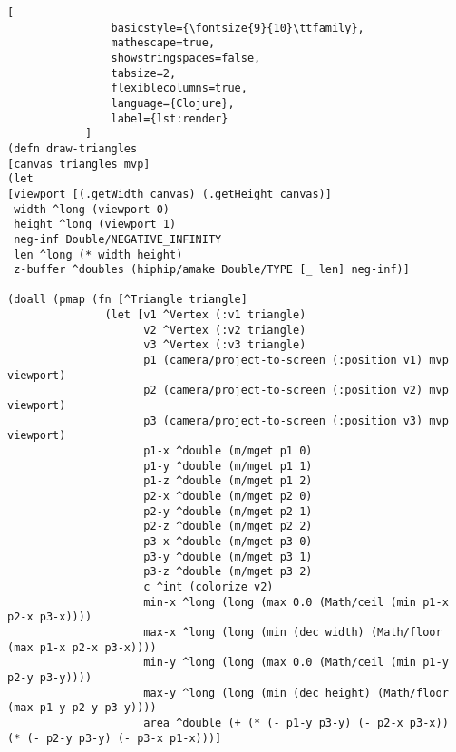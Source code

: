 \begin{lstlisting}[
                basicstyle={\fontsize{9}{10}\ttfamily},
                mathescape=true,
                showstringspaces=false,
                tabsize=2,
                flexiblecolumns=true,
                language={Clojure},
                label={lst:render}
            ]
(defn draw-triangles
[canvas triangles mvp]
(let
[viewport [(.getWidth canvas) (.getHeight canvas)]
 width ^long (viewport 0)
 height ^long (viewport 1)
 neg-inf Double/NEGATIVE_INFINITY
 len ^long (* width height)
 z-buffer ^doubles (hiphip/amake Double/TYPE [_ len] neg-inf)]

(doall (pmap (fn [^Triangle triangle]
               (let [v1 ^Vertex (:v1 triangle)
                     v2 ^Vertex (:v2 triangle)
                     v3 ^Vertex (:v3 triangle)
                     p1 (camera/project-to-screen (:position v1) mvp viewport)
                     p2 (camera/project-to-screen (:position v2) mvp viewport)
                     p3 (camera/project-to-screen (:position v3) mvp viewport)
                     p1-x ^double (m/mget p1 0)
                     p1-y ^double (m/mget p1 1)
                     p1-z ^double (m/mget p1 2)
                     p2-x ^double (m/mget p2 0)
                     p2-y ^double (m/mget p2 1)
                     p2-z ^double (m/mget p2 2)
                     p3-x ^double (m/mget p3 0)
                     p3-y ^double (m/mget p3 1)
                     p3-z ^double (m/mget p3 2)
                     c ^int (colorize v2)
                     min-x ^long (long (max 0.0 (Math/ceil (min p1-x p2-x p3-x))))
                     max-x ^long (long (min (dec width) (Math/floor (max p1-x p2-x p3-x))))
                     min-y ^long (long (max 0.0 (Math/ceil (min p1-y p2-y p3-y))))
                     max-y ^long (long (min (dec height) (Math/floor (max p1-y p2-y p3-y))))
                     area ^double (+ (* (- p1-y p3-y) (- p2-x p3-x)) (* (- p2-y p3-y) (- p3-x p1-x)))]


\end{lstlisting}
